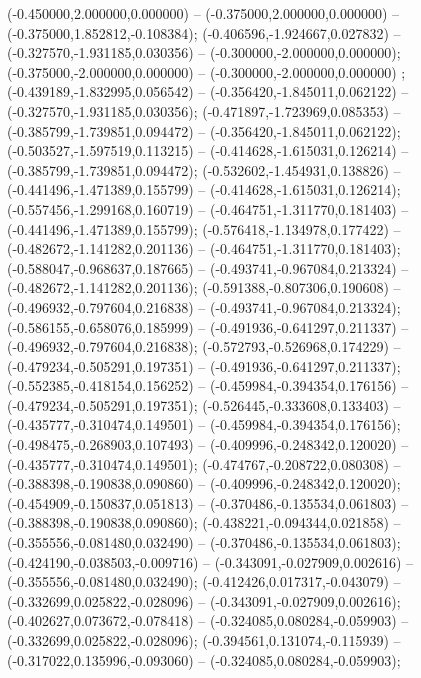  (-0.450000,2.000000,0.000000) -- (-0.375000,2.000000,0.000000) -- (-0.375000,1.852812,-0.108384);
 (-0.406596,-1.924667,0.027832) -- (-0.327570,-1.931185,0.030356) -- (-0.300000,-2.000000,0.000000);
 (-0.375000,-2.000000,0.000000) -- (-0.300000,-2.000000,0.000000) ;
 (-0.439189,-1.832995,0.056542) -- (-0.356420,-1.845011,0.062122) -- (-0.327570,-1.931185,0.030356);
 (-0.471897,-1.723969,0.085353) -- (-0.385799,-1.739851,0.094472) -- (-0.356420,-1.845011,0.062122);
 (-0.503527,-1.597519,0.113215) -- (-0.414628,-1.615031,0.126214) -- (-0.385799,-1.739851,0.094472);
 (-0.532602,-1.454931,0.138826) -- (-0.441496,-1.471389,0.155799) -- (-0.414628,-1.615031,0.126214);
 (-0.557456,-1.299168,0.160719) -- (-0.464751,-1.311770,0.181403) -- (-0.441496,-1.471389,0.155799);
 (-0.576418,-1.134978,0.177422) -- (-0.482672,-1.141282,0.201136) -- (-0.464751,-1.311770,0.181403);
 (-0.588047,-0.968637,0.187665) -- (-0.493741,-0.967084,0.213324) -- (-0.482672,-1.141282,0.201136);
 (-0.591388,-0.807306,0.190608) -- (-0.496932,-0.797604,0.216838) -- (-0.493741,-0.967084,0.213324);
 (-0.586155,-0.658076,0.185999) -- (-0.491936,-0.641297,0.211337) -- (-0.496932,-0.797604,0.216838);
 (-0.572793,-0.526968,0.174229) -- (-0.479234,-0.505291,0.197351) -- (-0.491936,-0.641297,0.211337);
 (-0.552385,-0.418154,0.156252) -- (-0.459984,-0.394354,0.176156) -- (-0.479234,-0.505291,0.197351);
 (-0.526445,-0.333608,0.133403) -- (-0.435777,-0.310474,0.149501) -- (-0.459984,-0.394354,0.176156);
 (-0.498475,-0.268903,0.107493) -- (-0.409996,-0.248342,0.120020) -- (-0.435777,-0.310474,0.149501);
 (-0.474767,-0.208722,0.080308) -- (-0.388398,-0.190838,0.090860) -- (-0.409996,-0.248342,0.120020);
 (-0.454909,-0.150837,0.051813) -- (-0.370486,-0.135534,0.061803) -- (-0.388398,-0.190838,0.090860);
 (-0.438221,-0.094344,0.021858) -- (-0.355556,-0.081480,0.032490) -- (-0.370486,-0.135534,0.061803);
 (-0.424190,-0.038503,-0.009716) -- (-0.343091,-0.027909,0.002616) -- (-0.355556,-0.081480,0.032490);
 (-0.412426,0.017317,-0.043079) -- (-0.332699,0.025822,-0.028096) -- (-0.343091,-0.027909,0.002616);
 (-0.402627,0.073672,-0.078418) -- (-0.324085,0.080284,-0.059903) -- (-0.332699,0.025822,-0.028096);
 (-0.394561,0.131074,-0.115939) -- (-0.317022,0.135996,-0.093060) -- (-0.324085,0.080284,-0.059903);
